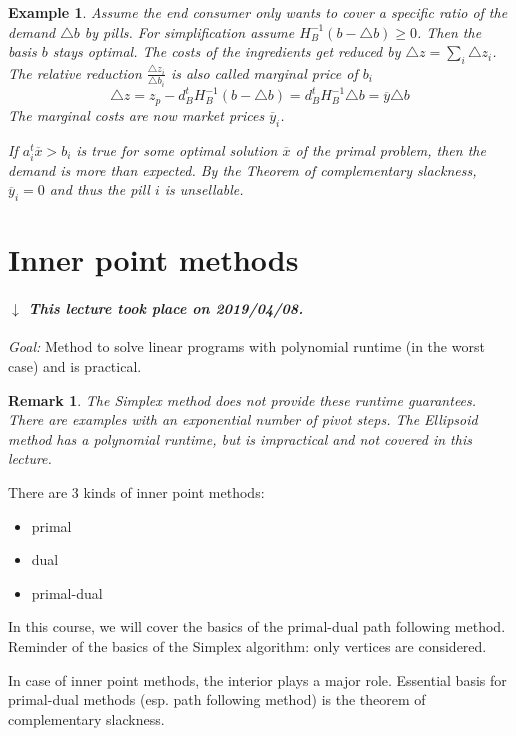 \documentclass[a4paper]{article}
\numberwithin{lecref}{subsection}
\newcounter{exercises}
\newtheorem{example}[exercises]{Example}
\newtheorem*{Remark}{Remark}
\newcommand{\dateref}[1]{%
  \begin{mdframed}[backgroundcolor=gray!10,innerbottommargin=0pt,innertopmargin=0pt]
    \paragraph{\textit{$\downarrow$ This lecture took place on #1.}}%
  \end{mdframed}%
}
\begin{document}
\begin{example}
	Assume the end consumer only wants to cover a specific ratio of the demand $\triangle b$ by pills.
	For simplification assume $H_B^{-1}(b - \triangle b) \geq 0$. Then the basis $b$ stays optimal.
	The costs of the ingredients get reduced by $\triangle z = \sum_i \triangle z_i$.
	The relative reduction $\frac{\triangle z_i}{\triangle b_i}$ is also called marginal price of $b_i$
	\[ \triangle z = z_p - d_B^t H_B^{-1} (b - \triangle b) = d_B^t H_B^{-1} \triangle b = \overline{y} \triangle b \]
	The marginal costs are now market prices $\overline{y}_i$.

	If $a_i^t \overline{x} > b_i$ is true for some optimal solution $\overline{x}$ of the primal problem,
	then the demand is more than expected. By the Theorem of complementary slackness,
	$\overline{y}_i = 0$ and thus the pill $i$ is unsellable.
\end{example}

\clearpage
\section{Inner point methods}
\dateref{2019/04/08}
\emph{Goal:} Method to solve linear programs with polynomial runtime (in the worst case) and is practical.

\begin{Remark}
	The Simplex method does not provide these runtime guarantees.
	There are examples with an exponential number of pivot steps.
	The Ellipsoid method has a polynomial runtime, but is impractical and not covered in this lecture.
\end{Remark}

There are 3 kinds of inner point methods:
\begin{itemize}
	\item primal
	\item dual
	\item primal-dual
\end{itemize}

In this course, we will cover the basics of the primal-dual path following method.
Reminder of the basics of the Simplex algorithm: only vertices are considered.

In case of inner point methods, the interior plays a major role.
Essential basis for primal-dual methods (esp. path following method) is the theorem of complementary slackness.
\end{document}
